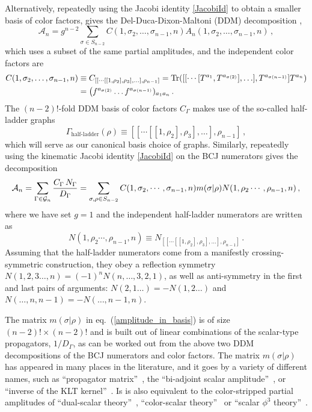\documentclass[11pt,a4paper]{article}
\def\eqn#1{eq.~(\ref{#1})}
\begin{document}
Alternatively, repeatedly using the Jacobi identity \eqref{JacobiId} to obtain a smaller basis of color factors, gives the Del-Duca-Dixon-Maltoni (DDM) decomposition  \cite{DelDuca:1999rs}, 
\begin{equation} 
    \mathcal{A}_n = g^{n-2}\sum_{\sigma\in S_{n-2}} C(1,\sigma_2,\ldots,\sigma_{n-1},n) 
    A_n(1,\sigma_2,\ldots,\sigma_{n-1},n) \, ,
\end{equation}
which uses a subset of the same partial amplitudes, and the independent color factors are
\begin{align}
C(1,\sigma_2,\ldots,\sigma_{n-1},n)&\equiv C_{[[\cdots [[1,\rho_2],\rho_3], \ldots ], \rho_{n-1}]} ={\rm Tr}( [[\cdots[T^{a_1}, T^{a_{{\sigma(2)}}}],\ldots], T^{a_{{\sigma(n-1)}}}] T^{a_n} ) \\ & = \big(f^{a_{\sigma(2)} } \ldots f^{a_{\sigma(n-1)}} )_{a_1 a_n}\,.
\end{align}
The $(n-2)!$-fold DDM basis of color factors $C_\Gamma$  makes use of the so-called half-ladder graphs 
\begin{equation}
\Gamma_\text{half-ladder}(\rho) \equiv {[[\cdots [[1,\rho_2],\rho_3], \ldots ], \rho_{n-1}]}\,,
\end{equation}
which will serve as our canonical basis choice of graphs. 
Similarly, repeatedly using the kinematic Jacobi identity \eqref{JacobiId} on the BCJ numerators gives the decomposition~\cite{Bern:2008qj,Vaman:2010ez}
\begin{align} \label{amplitude_in_basis}
\mathcal{A}_n=\sum_{\Gamma\in{\cal G}_n}\frac{C_\Gamma\,N_\Gamma}{D_\Gamma} = \sum_{\sigma,\rho \in S_{n-2}}  C(1,\sigma_2,\cdots,\sigma_{n-1},n) m(\sigma | \rho) N(1,\rho_2\cdots,\rho_{n-1},n)\,,
\end{align}
where we have set $g=1$ and the independent half-ladder numerators are written as
\begin{equation}
N(1,\rho_2\cdots,\rho_{n-1},n) \equiv N_{[[\cdots [[1,\rho_2],\rho_3], \ldots ], \rho_{n-1}]}\,.
\end{equation}
Assuming that the half-ladder numerators come from a manifestly crossing-symmetric construction, they obey a reflection symmetry $N(1,2,3\ldots,n) = (-1)^n N(n,\ldots,3,2,1)$, as well as anti-symmetry in the first and last pairs of arguments:  $N(2,1\ldots) =  -N(1,2\ldots)$ and $N(\ldots,n,n-1) =-  N(\ldots,n-1,n)$.

The matrix $m(\sigma | \rho)$ in \eqn{amplitude_in_basis} is of size $(n{-}2)!\times (n{-}2)!$ and is built out of linear combinations of the scalar-type propagators, $1/D_\Gamma$, as can be worked out from the above two DDM decompositions of the BCJ numerators and color factors. The matrix $m(\sigma | \rho)$ has appeared in many places in the literature, and it goes by a variety of different names, such as ``propagator matrix''~\cite{Vaman:2010ez}, the ``bi-adjoint scalar amplitude''~\cite{Cachazo:2013iea}, or ``inverse of the KLT kernel''~\cite{Kawai:1985xq,Cachazo:2013iea}. Is is also equivalent to the color-stripped partial amplitudes of ``dual-scalar theory''~\cite{Bern:2010yg,BjerrumBohr:2012mg}, ``color-scalar theory''~\cite{Du:2011js} or ``scalar $\phi^3$ theory''~\cite{Bern:1999bx,Chiodaroli:2014xia}. 
\end{document}

